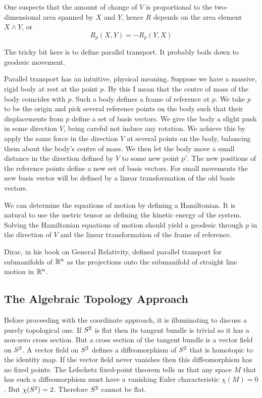 \documentclass[11pt, oneside]{article}
\begin{document}
One suspects that the amount of change of $V$ is proportional to the two-dimensional area spanned by $X$ and $Y$, hence $R$ depends
on the area element $X \wedge Y$, or 
\begin{equation}
	R_p(X,Y) = -R_p(Y,X)
\end{equation}

The tricky bit here is to define parallel transport.
It probably boils down to geodesic movement.

Parallel transport has an intuitive, physical meaning.
Suppose we have a massive, rigid body at rest at the point $p$.
By this I mean that the centre of mass of the body coincides with $p$.
Such a body defines a frame of reference at $p$.
We take $p$ to be the origin and pick several reference points on the body such that their displacements from $p$ define a set of basis vectors.
We give the body a slight push in some direction $V$, being careful not induce any rotation.
We achieve this by apply the same force in the direction $V$ at several points on the body, balancing them about the body's centre of mass.
We then let the body move a small distance in the direction defined by $V$ to some new point $p'$.
The new positions of the reference points define a new set of basis vectors.
For small movements the new basis vector will be defined by a linear transformation of the old basis vectors.

We can determine the equations of motion by defining a Hamiltonian.
It is natural to use the metric tensor as defining the kinetic energy of the system.
Solving the Hamiltonian equations of motion should yield a geodesic through $p$ in the direction of $V$ and the linear transformation of
the frame of reference.

Dirac, in his book on General Relativity, defined parallel transport for submanifolds of  $\mathbb{R}^n$ as the projections onto the submanifold of
straight line motion in $\mathbb{R}^n$.

\subsection{The Algebraic Topology Approach}

Before proceeding with the coordinate approach, it is illuminating to discuss a purely topological one.
If $S^2$ is flat then its tangent bundle is trivial so it has a non-zero cross section.
But a cross section of the tangent bundle is a vector field on $S^2$.
A vector field on $S^2$ defines a diffeomorphism of $S^2$ that is homotopic to the identity map.
If the vector field never vanishes then this diffeomorphism has no fixed points.
The Lefschetz fixed-point theorem tells us that any space $M$ that has such a diffeomorphism must have a vanishing Euler characteristic
$\chi(M) = 0$. But $\chi(S^2) = 2$. Therefore $S^2$ cannot be flat.
\end{document}
